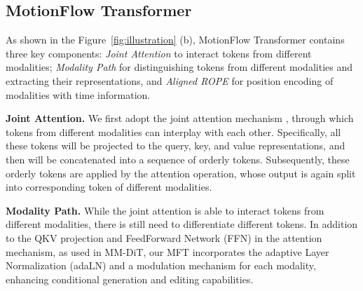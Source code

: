 \vspace{-1mm}
\subsection{MotionFlow Transformer} \label{sec:mft}
As shown in the Figure~\ref{fig:illustration} (b), MotionFlow Transformer contains three key components: \textit{Joint Attention} to interact tokens from different modalities; \textit{Modality Path} for distinguishing tokens from different modalities and extracting their representations, and \textit{Aligned ROPE} for position encoding of modalities with time information.

\noindent\textbf{Joint Attention.} 
We first adopt
the joint attention mechanism \cite{esser2024scaling}, through which tokens from different modalities can interplay with each other. Specifically, all these tokens will be projected to the query, key, and value representations, and then will be concatenated into a sequence of orderly tokens. Subsequently, these orderly tokens are applied by the attention operation, whose output is again split into corresponding token of different modalities.

\noindent\textbf{Modality Path.} While the joint attention is able to interact tokens from different modalities, there is still need to differentiate different tokens. In addition to the QKV projection and FeedForward Network (FFN) in the attention mechanism, %
as used in MM-DiT, our MFT incorporates the adaptive Layer Normalization (adaLN) and a modulation mechanism \cite{peebles2023scalable} for each modality, %
enhancing conditional generation and editing capabilities.

